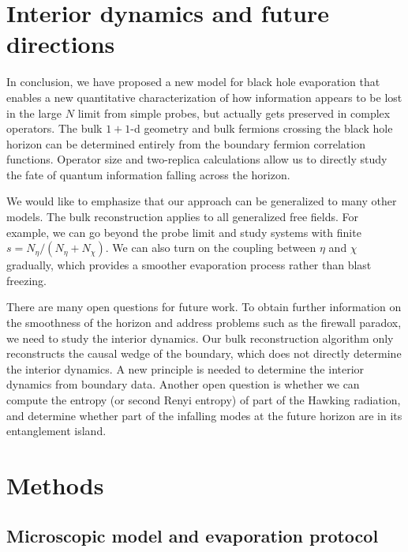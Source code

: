 \documentclass[pdflatex,sn-nature]{sn-jnl}
\begin{document}
\section{Interior dynamics and future directions}

In conclusion, we have proposed a new model for black hole evaporation that enables a new quantitative characterization of how information appears to be lost in the large $N$ limit from simple probes, but actually gets preserved in complex operators. The bulk $1+1$-d geometry and bulk fermions crossing the black hole horizon can be determined entirely from the boundary fermion correlation functions. Operator size and two-replica calculations allow us to directly study the fate of quantum information falling across the horizon.



We would like to emphasize that our approach can be generalized to many other models. The bulk reconstruction applies to all generalized free fields. For example, we can go beyond the probe limit and study systems with finite $s=N_\eta/(N_\eta+N_\chi)$. We can also turn on the coupling between $\eta$ and $\chi$ gradually, which provides a smoother evaporation process rather than blast freezing.

There are many open questions for future work. To obtain further information on the smoothness of the horizon and address problems such as the firewall paradox, we need to study the interior dynamics. Our bulk reconstruction algorithm only reconstructs the causal wedge of the boundary, which does not directly determine the interior dynamics. A new principle is needed to determine the interior dynamics from boundary data. Another open question is whether we can compute the entropy (or second Renyi entropy) of part of the Hawking radiation, and determine whether part of the infalling modes at the future horizon are in its entanglement island.

\section{Methods}
\label{sec:methods}

\subsection{Microscopic model and evaporation protocol}
\label{sec:methods-model}
\end{document}
